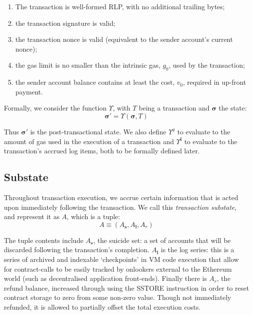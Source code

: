 \documentclass[UTF8,nofonts]{ctexart}
\begin{document}
\begin{multicols}{2}
\begin{enumerate}
\item The transaction is well-formed RLP, with no additional trailing bytes;
\item the transaction signature is valid;
\item the transaction nonce is valid (equivalent to the sender account's current nonce);
\item the gas limit is no smaller than the intrinsic gas, $g_0$, used by the transaction;
\item the sender account balance contains at least the cost, $v_0$, required in up-front payment.
\end{enumerate}

Formally, we consider the function $\Upsilon$, with $T$ being a transaction and $\boldsymbol{\sigma}$ the state:
\begin{equation}
\boldsymbol{\sigma}' = \Upsilon(\boldsymbol{\sigma}, T)
\end{equation}

Thus $\boldsymbol{\sigma}'$ is the post-transactional state. We also define $\Upsilon^g$ to evaluate to the amount of gas used in the execution of a transaction and $\Upsilon^\mathbf{l}$ to evaluate to the transaction's accrued log items, both to be formally defined later.

\subsection{Substate} 
Throughout transaction execution, we accrue certain information that is acted upon immediately following the transaction. We call this \textit{transaction substate}, and represent it as $A$, which is a tuple:
\begin{equation}
A \equiv (A_\mathbf{s}, A_\mathbf{l}, A_r)
\end{equation}

The tuple contents include $A_\mathbf{s}$, the suicide set: a set of accounts that will be discarded following the transaction's completion. $A_\mathbf{l}$ is the log series: this is a series of archived and indexable `checkpoints' in VM code execution that allow for contract-calls to be easily tracked by onlookers external to the Ethereum world (such as decentralised application front-ends). Finally there is $A_r$, the refund balance, increased through using the {\small SSTORE} instruction in order to reset contract storage to zero from some non-zero value. Though not immediately refunded, it is allowed to partially offset the total execution costs.


\end{multicols}
\end{document}
